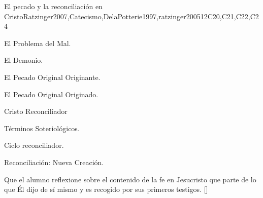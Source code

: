 \begin{syllabus}
\begin{unit}{}{El pecado y la reconciliación en Cristo}{Ratzinger2007,Catecismo,DelaPotterie1997,ratzinger2005}{12}{C20,C21,C22,C24}
\begin{topics}
	\item El Problema del Mal.
	    \begin{subtopics}
		\item El Demonio.
		\item El Pecado Original Originante.
		\item El Pecado Original Originado.
	    \end{subtopics}
	\item Cristo Reconciliador
	      \begin{subtopics}
		\item Términos Soteriológicos.
		\item Ciclo reconciliador.
		\item Reconciliación: Nueva Creación.
	      \end{subtopics}
\end{topics}
\begin{learningoutcomes}
	\item Que el alumno reflexione sobre el contenido de la fe en Jesucristo que parte de lo que Él dijo de sí mismo y es recogido por sus primeros testigos. [\Familiarity]
\end{learningoutcomes}
\end{unit}


\end{syllabus}
